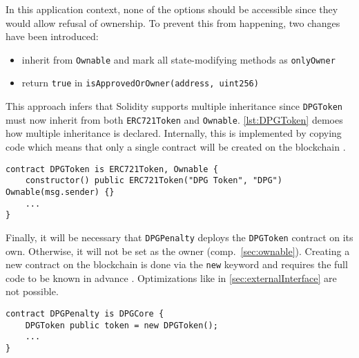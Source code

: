 In this application context, none of the options should be accessible since they would allow refusal of ownership. To prevent this from happening, two changes have been introduced: 

\begin{itemize}
  \item inherit from \texttt{Ownable} and mark all state-modifying methods as \texttt{onlyOwner}
  \item return \texttt{true} in \texttt{isApprovedOrOwner(address, uint256)}
\end{itemize}

This approach infers that Solidity supports multiple inheritance since \texttt{DPGToken} must now inherit from both \texttt{ERC721Token} and \texttt{Ownable}. \autoref{lst:DPGToken} demoes how multiple inheritance is declared. Internally, this is implemented by copying code which means that only a single contract will be created on the blockchain \cite[p.~88]{solidityDocs}. 

\begin{lstlisting}[language=Solidity, caption=Multiple inheritance by DPGToken, label=lst:DPGToken]
contract DPGToken is ERC721Token, Ownable {
	constructor() public ERC721Token("DPG Token", "DPG") Ownable(msg.sender) {}
	...
}
\end{lstlisting}

Finally, it will be necessary that \texttt{DPGPenalty} deploys the \texttt{DPGToken} contract on its own. Otherwise, it will not be set as the owner (comp.~\ref{sec:ownable}). Creating a new contract on the blockchain is done via the \texttt{new} keyword and requires the full code to be known in advance \cite[p.~71]{solidityDocs}. Optimizations like in \autoref{sec:externalInterface} are not possible. 

\begin{lstlisting}[language=Solidity, caption=Creating a contract from a contract, label=lst:DPGTokenCreation]
contract DPGPenalty is DPGCore {
	DPGToken public token = new DPGToken();
	...
}
\end{lstlisting}



